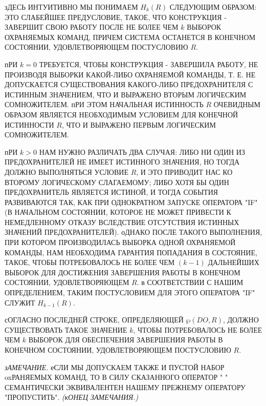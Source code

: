 зДЕСЬ ИНТУИТИВНО МЫ ПОНИМАЕМ $H_k(R)$ СЛЕДУЮЩИМ  ОБРАЗОМ: 
ЭТО СЛАБЕЙШЕЕ ПРЕДУСЛОВИЕ, ТАКОЕ, ЧТО КОНСТРУКЦИЯ -
ЗАВЕРШИТ СВОЮ РАБОТУ ПОСЛЕ НЕ БОЛЕЕ ЧЕМ $k$ ВЫБОРОК 
ОХРАНЯЕМЫХ КОМАНД, ПРИЧЕМ СИСТЕМА ОСТАНЕТСЯ В КОНЕЧНОМ 
СОСТОЯНИИ, УДОВЛЕТВОРЯЮЩЕМ ПОСТУСЛОВИЮ $R$.

пРИ $k=0$ ТРЕБУЕТСЯ, ЧТОБЫ КОНСТРУКЦИЯ - ЗАВЕРШИЛА 
РАБОТУ, НЕ ПРОИЗВОДЯ ВЫБОРКИ КАКОЙ-ЛИБО ОХРАНЯЕМОЙ КОМАНДЫ, 
Т. Е. НЕ ДОПУСКАЕТСЯ СУЩЕСТВОВАНИЯ КАКОГО-ЛИБО ПРЕДОХРАНИТЕЛЯ 
С ИСТИННЫМ ЗНАЧЕНИЕМ, ЧТО И ВЫРАЖЕНО ВТОРЫМ ЛОГИЧЕСКИМ 
СОМНОЖИТЕЛЕМ. пРИ ЭТОМ НАЧАЛЬНАЯ ИСТИННОСТЬ $R$ ОЧЕВИДНЫМ 
ОБРАЗОМ ЯВЛЯЕТСЯ НЕОБХОДИМЫМ УСЛОВИЕМ ДЛЯ КОНЕЧНОЙ ИСТИННОСТИ 
$R$, ЧТО И ВЫРАЖЕНО ПЕРВЫМ ЛОГИЧЕСКИМ СОМНОЖИТЕЛЕМ.

пРИ $k>0$ НАМ НУЖНО РАЗЛИЧАТЬ ДВА СЛУЧАЯ: ЛИБО НИ ОДИН ИЗ 
ПРЕДОХРАНИТЕЛЕЙ НЕ ИМЕЕТ ИСТИННОГО ЗНАЧЕНИЯ, НО ТОГДА ДОЛЖНО 
ВЫПОЛНЯТЬСЯ УСЛОВИЕ $R$, И ЭТО ПРИВОДИТ НАС КО ВТОРОМУ 
ЛОГИЧЕСКОМУ СЛАГАЕМОМУ; ЛИБО ХОТЯ БЫ ОДИН ПРЕДОХРАНИТЕЛЬ 
ЯВЛЯЕТСЯ ИСТИНОЙ, И ТОГДА СОБЫТИЯ РАЗВИВАЮТСЯ ТАК, КАК ПРИ 
ОДНОКРАТНОМ ЗАПУСКЕ ОПЕРАТОРА "IF" (В НАЧАЛЬНОМ СОСТОЯНИИ, 
КОТОРОЕ НЕ МОЖЕТ ПРИВЕСТИ К НЕМЕДЛЕННОМУ ОТКАЗУ ВСЛЕДСТВИЕ 
ОТСУТСТВИЯ ИСТИННЫХ ЗНАЧЕНИЙ ПРЕДОХРАНИТЕЛЕЙ). оДНАКО ПОСЛЕ 
ТАКОГО ВЫПОЛНЕНИЯ, ПРИ КОТОРОМ ПРОИЗВОДИЛАСЬ ВЫБОРКА ОДНОЙ 
ОХРАНЯЕМОЙ КОМАНДЫ, НАМ НЕОБХОДИМА ГАРАНТИЯ ПОПАДАНИЯ В 
СОСТОЯНИЕ, ТАКОЕ, ЧТОБЫ ПОТРЕБОВАЛОСЬ НЕ БОЛЕЕ
ЧЕМ $(k-1)$ ДАЛЬНЕЙШИХ ВЫБОРОК ДЛЯ ДОСТИЖЕНИЯ ЗАВЕРШЕНИЯ 
РАБОТЫ В КОНЕЧНОМ СОСТОЯНИИ, УДОВЛЕТВОРЯЮЩЕМ $R$. в 
СООТВЕТСТВИИ С НАШИМ ОПРЕДЕЛЕНИЕМ, ТАКИМ ПОСТУСЛОВИЕМ ДЛЯ 
ЭТОГО ОПЕРАТОРА "IF" СЛУЖИТ $H_{k-1}(R)$.

сОГЛАСНО ПОСЛЕДНЕЙ СТРОКЕ, ОПРЕДЕЛЯЮЩЕЙ $\wp(DO, R)$, ДОЛЖНО 
СУЩЕСТВОВАТЬ ТАКОЕ ЗНАЧЕНИЕ $k$, ЧТОБЫ ПОТРЕБОВАЛОСЬ НЕ БОЛЕЕ 
ЧЕМ $k$ ВЫБОРОК ДЛЯ ОБЕСПЕЧЕНИЯ ЗАВЕРШЕНИЯ РАБОТЫ В КОНЕЧНОМ 
СОСТОЯНИИ, УДОВЛЕТВОРЯЮЩЕМ ПОСТУСЛОВИЮ $R$.

{\sl зАМЕЧАНИЕ.} еСЛИ МЫ ДОПУСКАЕМ ТАКЖЕ И ПУСТОЙ НАБОР 
oxРАНЯЕМЫХ КОМАНД, ТО В СИЛУ СКАЗАННОГО ОПЕРАТОР " " 
СЕМАНТИЧЕСКИ ЭКВИВАЛЕНТЕН НАШЕМУ ПРЕЖНЕМУ ОПЕРАТОРУ 
"ПРОПУСТИТЬ". {\sl (кОНЕЦ ЗАМЕЧАНИЯ.)}

\bye
